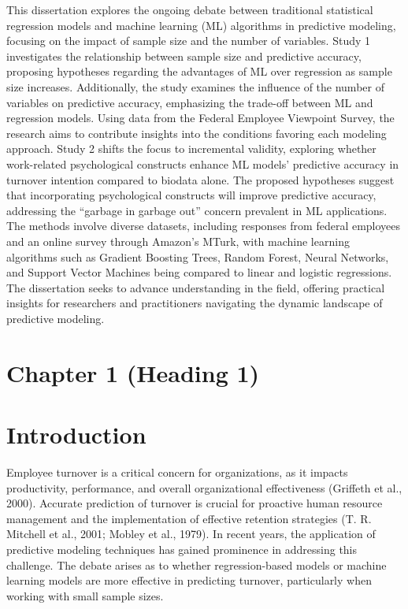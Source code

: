 \documentclass[
  man]{apa7}
\begin{document}
This dissertation explores the ongoing debate between traditional statistical regression models and machine learning (ML) algorithms in predictive modeling, focusing on the impact of sample size and the number of variables. Study 1 investigates the relationship between sample size and predictive accuracy, proposing hypotheses regarding the advantages of ML over regression as sample size increases. Additionally, the study examines the influence of the number of variables on predictive accuracy, emphasizing the trade-off between ML and regression models. Using data from the Federal Employee Viewpoint Survey, the research aims to contribute insights into the conditions favoring each modeling approach. Study 2 shifts the focus to incremental validity, exploring whether work-related psychological constructs enhance ML models' predictive accuracy in turnover intention compared to biodata alone. The proposed hypotheses suggest that incorporating psychological constructs will improve predictive accuracy, addressing the ``garbage in garbage out'' concern prevalent in ML applications. The methods involve diverse datasets, including responses from federal employees and an online survey through Amazon's MTurk, with machine learning algorithms such as Gradient Boosting Trees, Random Forest, Neural Networks, and Support Vector Machines being compared to linear and logistic regressions. The dissertation seeks to advance understanding in the field, offering practical insights for researchers and practitioners navigating the dynamic landscape of predictive modeling.

\newpage
{}
\renewcommand{\headrulewidth}{0pt}
\renewcommand{\footrulewidth}{0pt}

\tableofcontents

\section{Chapter 1 (Heading 1)}
\newpage

\section{Introduction}\label{introduction}

Employee turnover is a critical concern for organizations, as it impacts productivity, performance, and overall organizational effectiveness (Griffeth et al., 2000).
Accurate prediction of turnover is crucial for proactive human resource management and the implementation of effective retention strategies (T. R. Mitchell et al., 2001; Mobley et al., 1979).
In recent years, the application of predictive modeling techniques has gained prominence in addressing this challenge.
The debate arises as to whether regression-based models or machine learning models are more effective in predicting turnover, particularly when working with small sample sizes.
\end{document}
